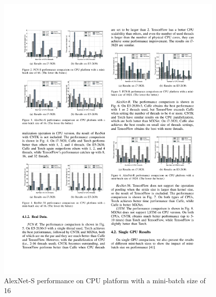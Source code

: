 \documentclass[11pt, oneside]{article}   	%
\begin{document}
\begin{figure}[htbp] 
	\includegraphics[width=\linewidth]{figures/AlexNet-S1.pdf} 
	\caption{AlexNet-S performance on CPU platform with a mini-batch size of 16}
\end{figure}
%
\end{document}
